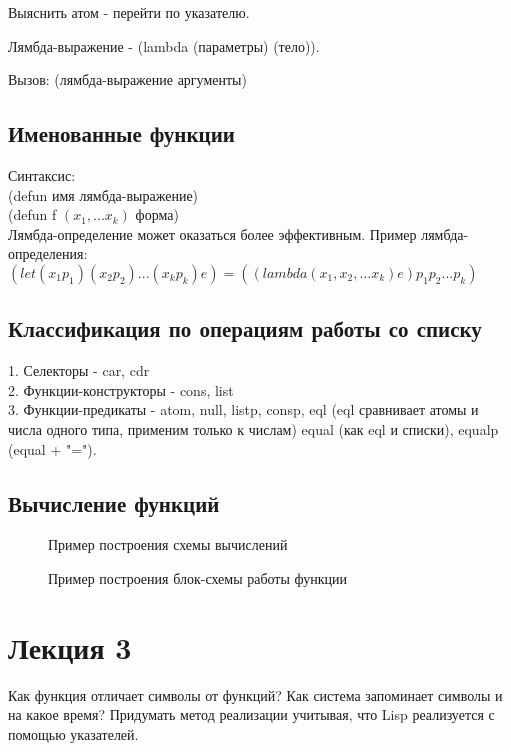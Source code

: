 Выяснить атом - перейти по указателю.

Лямбда-выражение - (lambda (параметры) (тело)).

Вызов: (лямбда-выражение аргументы)

\section{Именованные функции}
Синтаксис:\\
(defun имя лямбда-выражение)\\
(defun f $(x_{1},... x_{k})$ форма)\\

Лямбда-определение может оказаться более эффективным. Пример лямбда-определения:\\
$(let (x_{1} p_{1}) (x_{2} p_{2}) ... (x_{k}  p_{k}) e) = ((lambda (x_{1}, x_{2},... x_{k}) e) p_{1} p_{2} ... p_{k})$\\

\section{Классификация по операциям работы со списку}
1. Селекторы - car, cdr\\
2. Функции-конструкторы - cons, list\\
3. Функции-предикаты - atom, null, listp, consp, eql (eql сравнивает атомы и числа одного типа, применим только к числам) equal (как eql и списки), equalp (equal + "=").

\section{Вычисление функций}
\begin{figure}[H]
	\center{\texttt{[image: 1]}}
	\caption{Пример построения схемы вычислений}
\end{figure}

\begin{figure}[H]
	\center{\texttt{[image: 2]}}
	\caption{Пример построения блок-схемы работы функции}
\end{figure}

\chapter{Лекция 3}
Как функция отличает символы от функций?
Как система запоминает символы и на какое время?
Придумать метод реализации учитывая, что Lisp реализуется с помощью указателей.

